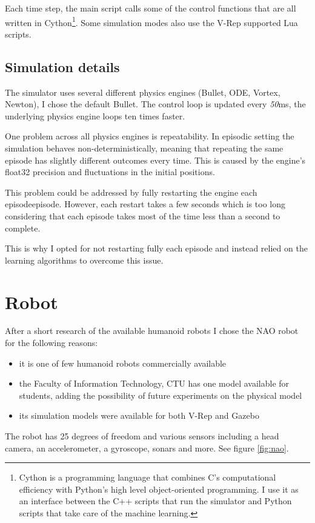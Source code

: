 Each time step, the main script calls some of the control functions that are all written in Cython\footnote{Cython is a programming language that combines C's computational efficiency with Python's high level object-oriented programming. I use it as an interface between the C++ scripts that run the simulator and Python scripts that take care of the machine learning.}.
Some simulation modes also use the V-Rep supported Lua scripts.

\subsection{Simulation details}

The simulator uses several different physics engines (Bullet, ODE, Vortex, Newton), I chose the default Bullet. The control loop is updated every \textit{50}ms, the underlying physics engine loops ten times faster.

One problem across all physics engines is repeatability. In episodic setting the simulation behaves non-deterministically, meaning that repeating the same episode has slightly different outcomes every time. This is caused by the engine's float32 precision and fluctuations in the initial positions.

This problem could be addressed by fully restarting the engine each episodeepisode. However, each restart takes a few seconds which is too long considering that each episode takes most of the time less than a second to complete.

This is why I opted for not restarting fully each episode and instead relied on the learning algorithms to overcome this issue.

\section{Robot}

After a short research of the available humanoid robots I chose the NAO robot for the following reasons:
\begin{itemize}
\item it is one of few humanoid robots commercially available
\item the Faculty of Information Technology, CTU has one model available for students, adding the possibility of future experiments on the physical model
\item its simulation models were available for both V-Rep and Gazebo
\end{itemize}
The robot has 25 degrees of freedom and various sensors including a head camera, an accelerometer, a gyroscope, sonars and more. See figure \ref{fig:nao}.

